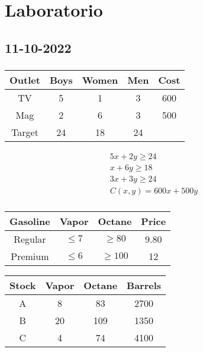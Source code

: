 \part{Laboratorio}

\chapter{11-10-2022}

\section{}

\begin{center}
    \begin{tabular}{||c c c c c||}
        \hline
        Outlet & Boys & Women & Men & Cost \\
        \hline
        \hline
        TV & 5 & 1 & 3 & 600 \\
        \hline
        Mag & 2 & 6 & 3 & 500 \\
        \hline
        Target & 24 & 18 & 24 & \\
        \hline
    \end{tabular}
\end{center}

\begin{align}
    \text{$5x + 2y \geq 24$} \\
    \text{$x + 6y \geq 18$} \\
    \text{$3x + 3y \geq 24$} \\
    \text{$C(x,y) = 600x + 500y$}
\end{align}

\section{}

\begin{center}
    \begin{tabular}{||c c c c||}
        \hline
        Gasoline & Vapor & Octane & Price \\
        \hline
        \hline
        Regular & $\leq 7$ & $\geq 80$ & 9.80 \\
        \hline
        Premium & $\leq 6$ & $\geq 100$ & 12 \\
        \hline
    \end{tabular}
\end{center}

\begin{center}
    \begin{tabular}{||c c c c||}
        \hline
        Stock & Vapor & Octane & Barrels \\
        \hline
        \hline
        A & 8 & 83 & 2700 \\
        \hline
        B & 20 & 109 & 1350 \\
        \hline
        C & 4 & 74 & 4100 \\
        \hline
    \end{tabular}
\end{center}

